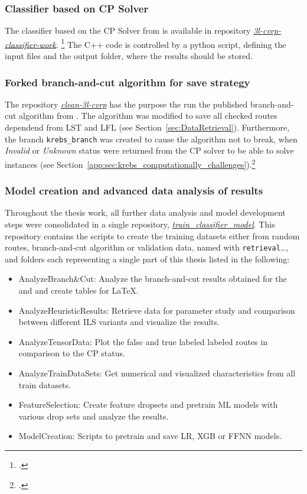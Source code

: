 \subsubsection{Classifier based on CP Solver}
The classifier based on the \gls{CP} Solver from \cite{tamke_repository_2024} is available in
repository \href{https://github.com/MxHbm/3l-cvrp-classifier-work}{\textit{3l-cvrp-classifier-work}}. \footcite{tamke_repository_2024}
The C++ code is controlled by a python script, defining the input files and the output folder, where the results should be stored.

\subsubsection{Forked branch-and-cut algorithm for save strategy}
The  repository \href{https://github.com/MxHbm/clean-3l-cvrp}{\textit{clean-3l-cvrp}} has the purpose the run the published branch-and-cut algorithm from \cite{tamke_branch-and-cut_2024}. The algorithm
was modified to save all checked routes dependend from \gls{LST} and \gls{LFL} (see Section~\ref{sec:DataRetrieval}). Furthermore,
the branch \texttt{krebs\_branch} was created to cause the algorithm not to break, when \textit{Invalid} or \textit{Unknown}
status were returned from the \gls{CP} solver to be able to solve \krebsADataSetText instances (see Section~\ref{app:sec:krebs_computationally_challenges}).\footcite[cf.][]{tamke_branch-and-cut_2024}

\subsubsection{Model creation and advanced data analysis of results}

Throughout the thesis work, all further data analysis and model development steps were consolidated in a single repository,
\href{https://github.com/MxHbm/train_classifier_model}{\textit{train\_classifier\_model}}. This repository contains the scripts to
create the training datasets either from random routes, branch-and-cut algorithm or validation data, named with \texttt{retrieval}\dots,
and folders each representing a single part of this thesis listed in the following:
\begin{itemize}
	\item AnalyzeBranch\&Cut: Analyze the branch-and-cut results obtained for the \gendreauDataSetText and \krebsADataSetText and create tables for \LaTeX.
	\item AnalyzeHeuristicResults: Retrieve data for parameter study and comparison between different \gls{ILS} variants and visualize the results.
	\item AnalyzeTensorData: Plot the false and true labeled labeled routes in comparison to the \gls{CP} status.
	\item AnalyzeTrainDataSets: Get numerical and visualized characteristics from all train datasets.
	\item FeatureSelection: Create feature dropsets and pretrain \gls{ML} models with various drop sets and analyze the results.
	\item ModelCreation: Scripts to pretrain and save \gls{LR}, \gls{XGB} or \gls{FFNN} models.
\end{itemize}

